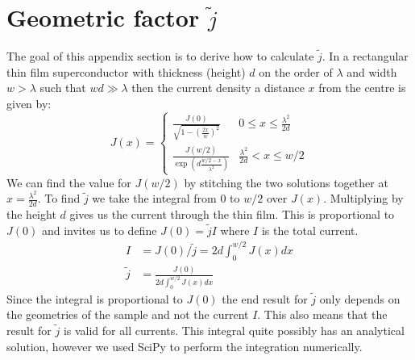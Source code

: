 \section{Geometric factor $\tilde{j}$}
\label{app:derivation-geometric-factor-j}
The goal of this appendix section is to derive how to calculate $\tilde{j}$. In a rectangular thin film superconductor with thickness (height) $d$ on the order of $\lambda$ and width $w > \lambda$ such that $wd \gg \lambda$ then the current density a distance $x$ from the centre is given by\cite{rhoderickCurrentDistributionThin1962}:
\begin{equation}
	J(x) = \begin{cases}
		\frac{J(0)}{\sqrt{1 - \left(\frac{2x}{w}\right)^2}} & 0 \leq x \leq \frac{\lambda^2}{2d} \\
		\frac{J(w/2)}{\exp\left(d\frac{w/2 - x}{\lambda^2} \right)} & \frac{\lambda^2}{2d} < x \leq w/2
	\end{cases}
\end{equation}
We can find the value for $J(w/2)$ by stitching the two solutions together at $x = \frac{\lambda^2}{2d}$. To find $\tilde{j}$ we take the integral from $0$ to $w/2$ over $J(x)$. Multiplying by the height $d$ gives us the current through the thin film. This is proportional to $J(0)$ and invites us to define $J(0) = \tilde{j}I$ where $I$ is the total current. 
\begin{align}
	I &= J(0) / \tilde{j} = 2d \int_0^{w/2} J(x)dx \nonumber \\
	\tilde{j} &= \frac{J(0)}{2d \int_0^{w/2} J(x)dx}
	\label{eqn:geometric-factor-j}
\end{align}
Since the integral is proportional to $J(0)$ the end result for $\tilde{j}$ only depends on the geometries of the sample and not the current $I$. This also means that the result for $\tilde{j}$ is valid for all currents. This integral quite possibly has an analytical solution, however we used SciPy to perform the integration numerically.